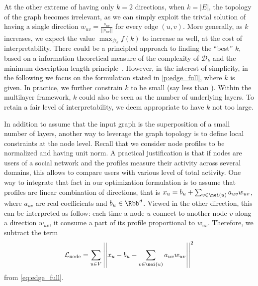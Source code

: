 \bigskip

At the other extreme of having only $k=2$ directions, when $k=|E|$, the topology of the graph
becomes irrelevant, as we can simply exploit the trivial
solution of having a single direction $w_{uv} = \frac{s_{uv}}{||s_{uv}||}$ for every edge $(u,v)$.
More generally, as $k$ increases, we expect the value $\max_{\mathcal{D}_k} f(k)$ to increase as
well, at the cost of interpretability. There could be a principled approach to finding the
\enquote{best} $k$, based on a information theoretical measure of the complexity of $\mathcal{D}_k$
and the minimum description length principle~\autocite{grunwald2005tutorial}. However, in the
interest of simplicity, in the following we focus on the formulation stated in
\autoref{p:edge_full}, where $k$ is given. In practice, we further constrain $k$ to be small (say
less than ). Within the multilayer framework, $k$ could also be seen as the number of
underlying layers. To retain a fair level of interpretability, we deem appropriate to have $k$ not
too large.

In addition to assume that the input graph is the superposition of a small number of layers,
another way to leverage the graph topology is to define local constraints at the node level. 
Recall that we consider node profiles to be normalized and having unit norm. A practical
justification is that if nodes are
users of a social network and the profiles measure their activity across several domains, this
allows to compare users with various level of total activity. One way to integrate that fact in
our optimization formulation is to assume that profiles are linear combination of directions, that
is $x_u = b_u + \sum_{v \in \nei(u)} a_{uv} w_{uv}$, where $a_{uv}$ are real coefficients and $b_u
\in \Rbb^d$. Viewed in the other direction, this can be interpreted as follow: each time a node $u$
connect to another node $v$ along a direction $w_{uv}$, it consume a part of its profile
proportional to $w_{uv}$. Therefore, we subtract the term 
\begin{equation}
  \label{eq:edge_node_loss}
  \mathcal{L}_{\mathrm{node}} = 
  \sum_{u\in V} \left|\left| x_u - b_u - \sum_{v \in \nei(u)} a_{uv} w_{uv} \right|\right|^2
\end{equation}
from \eqref{eq:edge_full}.


